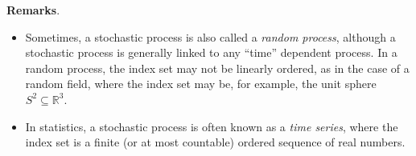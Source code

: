 \documentclass[12pt]{article}
\begin{document}
\textbf{Remarks}.
\begin{itemize}
\item Sometimes, a stochastic process is also called a
\emph{random process}, although a stochastic process is generally
linked to any ``time'' dependent process.  In a random process, the
index set may not be linearly ordered, as in the case of a random
field, where the index set may be, for example, the unit sphere $S^2\subseteq\mathbb{R}^3$.
\item In statistics, a stochastic process is often known as a
\emph{time series}, where the index set is a finite (or at most
countable) ordered sequence of real numbers.
\end{itemize}

\end{document}
